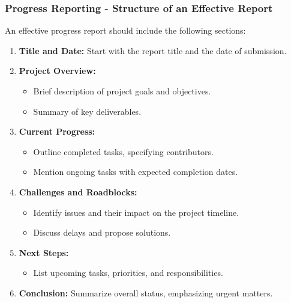 \documentclass[aspectratio=169]{beamer}
\begin{document}
\begin{frame}[fragile]
    \frametitle{Progress Reporting - Structure of an Effective Report}
    An effective progress report should include the following sections:
    
    \begin{enumerate}
        \item \textbf{Title and Date:} Start with the report title and the date of submission.
        \item \textbf{Project Overview:}
            \begin{itemize}
                \item Brief description of project goals and objectives.
                \item Summary of key deliverables.
            \end{itemize}
        \item \textbf{Current Progress:}
            \begin{itemize}
                \item Outline completed tasks, specifying contributors.
                \item Mention ongoing tasks with expected completion dates.
            \end{itemize}
        \item \textbf{Challenges and Roadblocks:}
            \begin{itemize}
                \item Identify issues and their impact on the project timeline.
                \item Discuss delays and propose solutions.
            \end{itemize}
        \item \textbf{Next Steps:}
            \begin{itemize}
                \item List upcoming tasks, priorities, and responsibilities.
            \end{itemize}
        \item \textbf{Conclusion:} Summarize overall status, emphasizing urgent matters.
    \end{enumerate}
\end{frame}
\end{document}
